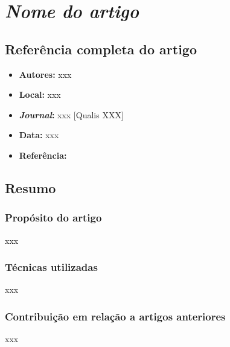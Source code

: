 \section{\textit{Nome do artigo}}


\subsection{Referência completa do artigo}

\begin{itemize}
  \item \textbf{Autores:} xxx
  \item \textbf{Local:} xxx
  \item \textbf{\textit{Journal}:} xxx [Qualis XXX]
  \item \textbf{Data:} xxx
  \item \textbf{Referência:} 
\end{itemize}


\subsection{Resumo}
\subsubsection{Propósito do artigo}
xxx

\subsubsection{Técnicas utilizadas} 
xxx

\subsubsection{Contribuição em relação a artigos anteriores} %
xxx

